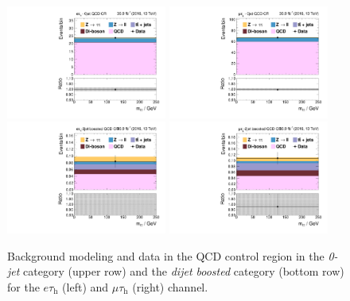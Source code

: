 \begin{figure}[h!]
     \centering
     \includegraphics[width=0.47\textwidth]{Figures/background_estimation/qcd_et_control-regions/htt_inputet11__htt_et_11_13TeV.pdf}
     \includegraphics[width=0.47\textwidth]{Figures/background_estimation/qcd_mt_control-regions/htt_inputmt11__htt_mt_11_13TeV.pdf} \\
     \includegraphics[width=0.47\textwidth]{Figures/background_estimation/qcd_et_control-regions/htt_inputet20__htt_et_20_13TeV.pdf}
     \includegraphics[width=0.47\textwidth]{Figures/background_estimation/qcd_mt_control-regions/htt_inputmt20__htt_mt_20_13TeV.pdf} 
  \caption[QCD control region in the \textit{0-jet} and \textit{dijet boosted} category.]{Background modeling and data in the QCD control region in the \textit{0-jet} category (upper row) and the \textit{dijet boosted} category (bottom row) for the $e\tau_\text{h}$ (left) and $\mu\tau_\text{h}$ (right) channel.}\label{fig:etmtqcd:0jet_qcd_control}
 \end{figure}%
 
